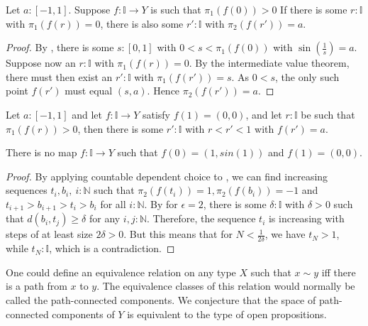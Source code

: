 \documentclass{../util/zariski}
\begin{document}
\begin{lemma}
  Let $a:[-1,1]$. 
  Suppose $f:\mathbb I \to Y$ is such that $\pi_1(f(0)) > 0$
  If there is some $r:\mathbb I$ with $\pi_1(f(r)) = 0$, 
  there is also some $r':\mathbb I$ with $\pi_2(f(r')) = a$. 
\end{lemma}
\begin{proof}
  By , there is some $s:[0,1]$ with $0<s<\pi_1(f(0))$ with $\sin(\frac1s) = a$. 
  Suppose now an $r:\mathbb I$ with $\pi_1(f(r)) = 0$. 
  By the intermediate value theorem, there must then exist an $r':\mathbb I$ with $\pi_1(f(r')) = s$. 
  As $0<s$, the only such point $f(r')$ must equal $(s, a)$.
  Hence $\pi_2(f(r')) = a$. 
\end{proof}  
\begin{corollary}\label{topologistsSineCurveWillHitInfinitelyManyTimes}
  Let $a:[-1,1]$ and let $f:\mathbb I \to Y$ satisfy $f(1) = (0,0)$, 
  and let $r:\mathbb I$ be such that $\pi_1(f(r))>0$, 
  then there is some $r':\mathbb I$ with $r<r'<1$ with $f(r') = a$. 
\end{corollary}

\begin{theorem}
  There is no map $f:\mathbb I \to Y$ such that $f(0) = (1,sin(1))$ and $f(1) = (0,0)$. 
\end{theorem}
\begin{proof}
  By applying countable dependent choice to , 
  we can find increasing sequences $t_i,b_i,~i:\mathbb N$ such that $\pi_2(f(t_i)) = 1, \pi_2(f(b_i)) = -1$ and 
  $t_{i+1}>b_{i+1}>t_i>b_i$ for all $i:\mathbb N$. 
  By  for $\epsilon = 2$, there is some $\delta:\mathbb I$ with $\delta>0$ such that 
  $d(b_i, t_j)\geq \delta$ for any $i,j:\mathbb N$. 
  Therefore, the sequence $t_i$ is increasing with steps of at least size $2\delta>0$. 
  But this means that for $N<\frac1{2\delta}$, we have $t_{N}>1$, while $t_N :\mathbb I$, which is a contradiction. 
\end{proof}

\begin{remark}
  One could define an equivalence relation on any type $X$ such that 
  $x\sim y$ iff there is a path from $x$ to $y$. 
  The equivalence classes of this relation would normally be called the path-connected components. 
  We conjecture that the space of path-connected components of $Y$ is equivalent to the type of open propositions. 
\end{remark}
\end{document}

